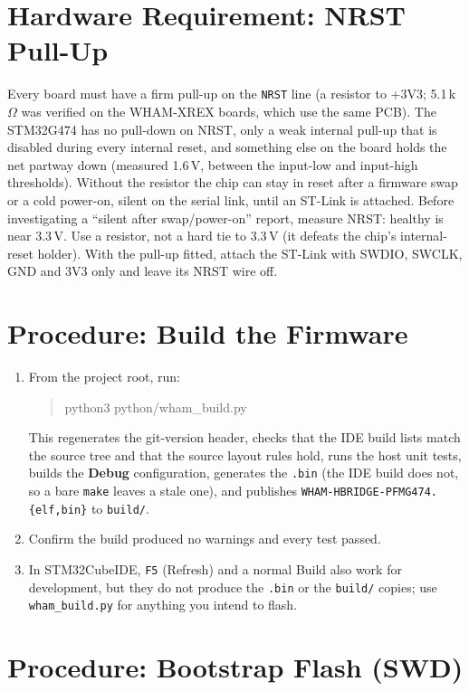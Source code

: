\documentclass[11pt]{article}
\newcommand{\code}[1]{\texttt{#1}}
\begin{document}
\section{Hardware Requirement: NRST Pull-Up}
\label{sec:nrst}

Every board must have a firm pull-up on the \code{NRST} line (a resistor to
+3V3; 5.1\,k$\Omega$ was verified on the WHAM-XREX boards, which use the
same PCB). The STM32G474 has no pull-down on NRST, only a weak internal
pull-up that is disabled during every internal reset, and something else
on the board holds the net partway down (measured 1.6\,V, between the
input-low and input-high thresholds). Without the resistor the chip can stay
in reset after a firmware swap or a cold power-on, silent on the serial link,
until an ST-Link is attached. Before investigating a ``silent after
swap\slash power-on'' report, measure NRST: healthy is near 3.3\,V. Use a
resistor, not a hard tie to 3.3\,V (it defeats the chip's internal-reset
holder). With the pull-up fitted, attach the ST-Link with SWDIO, SWCLK, GND
and 3V3 only and leave its NRST wire off.

\section{Procedure: Build the Firmware}
\label{sec:build}

\begin{enumerate}[label=\arabic*.]
  \item From the project root, run:
\begin{quote}\ttfamily\small\raggedright
python3 python/wham\_build.py
\end{quote}
    This regenerates the git-version header, checks that the IDE build
    lists match the source tree and that the source layout rules hold, runs
    the host unit tests, builds the \textbf{Debug} configuration, generates
    the \code{.bin} (the IDE build does not, so a bare \code{make} leaves a
    stale one), and publishes \code{WHAM-HBRIDGE-PFMG474.\{elf,bin\}} to
    \code{build/}.
  \item Confirm the build produced no warnings and every test passed.
  \item In STM32CubeIDE, \code{F5} (Refresh) and a normal Build also work
    for development, but they do not produce the \code{.bin} or the
    \code{build/} copies; use \code{wham\_build.py} for anything you intend
    to flash.
\end{enumerate}

\section{Procedure: Bootstrap Flash (SWD)}
\label{sec:bootstrap}
\end{document}
